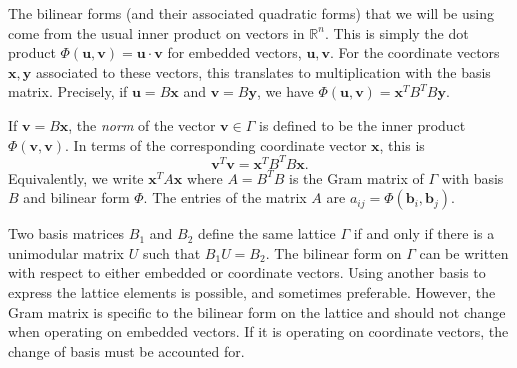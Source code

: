 The bilinear forms (and their associated quadratic forms) that we will be using come from the usual inner product on vectors in $\mathbb{R}^n$. This is simply the dot product $\Phi(\mathbf{u},\mathbf{v}) = \mathbf{u} \cdot \mathbf{v}$ for embedded vectors, $\mathbf{u},\mathbf{v}$. For the coordinate vectors $\mathbf{x},\mathbf{y}$ associated to these vectors, this translates to multiplication with the basis matrix. Precisely, if $\mathbf{u} = B\mathbf{x}$ and $\mathbf{v} = B\mathbf{y}$, we have $\Phi(\mathbf{u},\mathbf{v}) = \mathbf{x}^TB^TB\mathbf{y}$. 

If $\mathbf{v} = B\mathbf{x}$, the \textit{norm} of the vector $\mathbf{v} \in \Gamma$ is defined to be the inner product $\Phi(\mathbf{v},\mathbf{v})$. In terms of the corresponding coordinate vector $\mathbf{x}$, this is
\[\mathbf{v}^T\mathbf{v} = \mathbf{x}^TB^TB\mathbf{x}.\]
Equivalently, we write $\mathbf{x}^TA\mathbf{x}$ where $A = B^TB$ is the Gram matrix of $\Gamma$ with basis $B$ and bilinear form $\Phi$. The entries of the matrix $A$ are $a_{ij} = \Phi(\mathbf{b}_i,\mathbf{b}_j)$.

Two basis matrices $B_1$ and $B_2$ define the same lattice $\Gamma$ if and only if there is a unimodular matrix $U$ such that $B_1U = B_2$. The bilinear form on $\Gamma$ can be written with respect to either embedded or coordinate vectors. Using another basis to express the lattice elements is possible, and sometimes preferable. However, the Gram matrix is specific to the bilinear form on the lattice and should not change when operating on embedded vectors. If it is operating on coordinate vectors, the change of basis must be accounted for. 


\endinput

Any text after an \endinput is ignored.
You could put scraps here or things in progress.